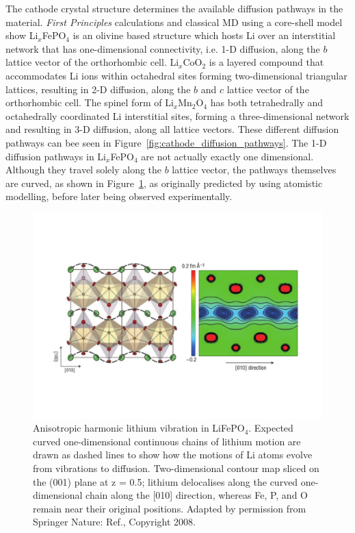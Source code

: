\documentclass[../main.tex]{subfiles}
\begin{document}
The cathode crystal structure determines the available diffusion pathways in the material. \textit{First Principles} calculations\cite{Morgan2004,ouyang2004first} and classical MD using a core-shell model\cite{islam2005atomic} show Li$_x$FePO$_4$ is an olivine based structure which hosts Li over an interstitial network that has one-dimensional connectivity, i.e. 1-D diffusion, along the $b$ lattice vector of the orthorhombic cell.\cite{amin2006anisotropy} Li$_x$CoO$_2$ is a layered compound that accommodates Li ions within octahedral sites forming two-dimensional triangular lattices, resulting in 2-D diffusion, along the $b$ and $c$ lattice vector of the orthorhombic cell. \cite{van2000lithium} The spinel form of Li$_x$Mn$_2$O$_4$ has both tetrahedrally and octahedrally coordinated Li interstitial sites, forming a three-dimensional network and resulting in 3-D diffusion, along all lattice vectors. \cite{thackeray1997manganese,proell20123d} These different diffusion pathways can bee seen in Figure~\ref{fig:cathode_diffusion_pathways}. The 1-D diffusion pathways in Li$_x$FePO$_4$ are not actually exactly one dimensional. Although they travel solely along the $b$ lattice vector, the pathways themselves are curved, as shown in Figure~\ref{fig:curved_pathways}, as originally predicted by \citeauthor{islam2005atomic} using atomistic modelling,\cite{islam2005atomic} before later being observed experimentally.\cite{nishimura2008experimental}

\begin{figure}
    \centering
    \includegraphics[scale=0.5]{figures/curved_1D_paths.pdf}
    \caption{Anisotropic harmonic lithium vibration in LiFePO$_4$. Expected curved one-dimensional continuous chains of lithium motion are drawn as dashed lines to show how the motions of Li atoms evolve from vibrations to diffusion. Two-dimensional contour map sliced on the (001) plane at z = 0.5; lithium delocalises along the curved one-dimensional chain along the [010] direction, whereas Fe, P, and O remain near their original positions.
    Adapted by permission from Springer Nature: Ref., Copyright 2008.}
    \label{fig:curved_pathways}
\end{figure}
\end{document}

